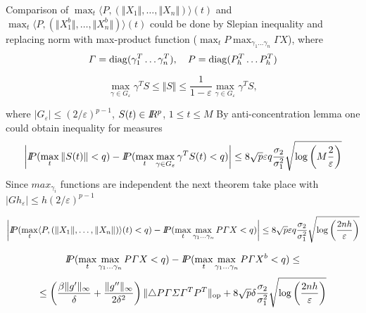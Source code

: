 Comparison of
$
\max_t \langle P ,  (\Vert  X_1 \Vert, \ldots, \Vert  X_n \Vert)  \rangle (t) 
$
and
$
\max_t \langle P , (\Vert  X_1^b \Vert, \ldots, \Vert  X_n^b \Vert) \rangle (t)
$
could be done by Slepian inequality and replacing norm with max-product function ($\max_t P \max_{\gamma_1 \ldots \gamma_n} \Gamma X  $), where 
\[
\Gamma = \diag (\gamma_1^T \ldots \gamma_n^T),
\quad
P =  \diag (P_h^T \ldots P_h^T)
\] 
\begin{lemma}
\[
 \max_{\gamma \in G_{\varepsilon}} \gamma^T S   \leq  \Vert S \Vert \leq \frac{1}{1 - \varepsilon} \max_{\gamma \in G_{\varepsilon}} \gamma^T S, 
\]
\end{lemma}
where $|G_{\varepsilon}| \leq  (2/\varepsilon)^{p-1}$, $S(t) \in \R^{p}$, $ 1\leq t\leq M$
By anti-concentration lemma one could obtain inequality for measures
\[
\bigg| \P (\max_{t} \Vert S(t) \Vert < q) - \P ( \max_{t} \max_{\gamma \in G_{\varepsilon}} \gamma^T S(t) < q) \bigg| 
\leq 
8 \sqrt{p} \varepsilon q \frac{\sigma_2}{\sigma_1^2}\sqrt{\log \left( M \frac{2}{\varepsilon} \right)}
\] 
Since $max_{\gamma_i}$ functions are independent the next theorem take place with $|Gh_{\varepsilon}| \leq h (2/\varepsilon)^{p-1} $
\begin{theorem}
\[
\bigg| \P ( \max_t \langle P ,  (\Vert  X_1 \Vert, \ldots, \Vert  X_n \Vert)  \rangle (t)  < q) - \P (\max_t  \max_{\gamma_1 \ldots \gamma_n} P \Gamma X < q) \bigg| 
\leq 
8 \sqrt{p} \varepsilon q \frac{\sigma_2}{\sigma_1^2}\sqrt{\log \left(  \frac{2nh}{\varepsilon} \right)}
\] 
\end{theorem}

\begin{theorem}
\[
 \P (\max_t  \max_{\gamma_1 \ldots \gamma_n} P \Gamma X < q) - 
 \P (\max_t  \max_{\gamma_1 \ldots \gamma_n} P \Gamma X^b < q)  
 \leq 
 \]
 \[
 \leq  
 \left( 
\frac{\beta \Vert g' \Vert_\infty}{\delta} + \frac{\Vert g'' \Vert_\infty }{2 \delta^2}
\right) \Vert \triangle P \Gamma \Sigma \Gamma^T P^T \Vert_{\oper} + 8 \sqrt{p} \delta \frac{\sigma_2}{\sigma_1^2}\sqrt{\log \left(  \frac{2nh}{\varepsilon} \right)}
\]
\end{theorem}

 

